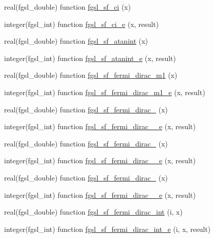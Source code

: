 \begin{DoxyCompactItemize}
\item 
real(fgsl\-\_\-double) function \hyperlink{specfunc_8finc_af37d91f8a5f87d50df39eb28669792a1}{fgsl\-\_\-sf\-\_\-ci} (x)
\item 
integer(fgsl\-\_\-int) function \hyperlink{specfunc_8finc_a60780872ace717f6d08ba8818deafd29}{fgsl\-\_\-sf\-\_\-ci\-\_\-e} (x, result)
\item 
real(fgsl\-\_\-double) function \hyperlink{specfunc_8finc_aea59dd2be70a210689b1d8c72fe0c188}{fgsl\-\_\-sf\-\_\-atanint} (x)
\item 
integer(fgsl\-\_\-int) function \hyperlink{specfunc_8finc_a50b0fa2ad22bafa445a01572532bef66}{fgsl\-\_\-sf\-\_\-atanint\-\_\-e} (x, result)
\item 
real(fgsl\-\_\-double) function \hyperlink{specfunc_8finc_a93a0202e4ca9ec26774efcda9cba3d9e}{fgsl\-\_\-sf\-\_\-fermi\-\_\-dirac\-\_\-m1} (x)
\item 
integer(fgsl\-\_\-int) function \hyperlink{specfunc_8finc_a2634cfd8188ced8da822511514bea417}{fgsl\-\_\-sf\-\_\-fermi\-\_\-dirac\-\_\-m1\-\_\-e} (x, result)
\item 
real(fgsl\-\_\-double) function \hyperlink{specfunc_8finc_a45b38529fa2fd7f50dca41709c8414fc}{fgsl\-\_\-sf\-\_\-fermi\-\_\-dirac\-\_} (x)
\item 
integer(fgsl\-\_\-int) function \hyperlink{specfunc_8finc_a17a9fa088836577a44dd0b3dacbf15d9}{fgsl\-\_\-sf\-\_\-fermi\-\_\-dirac\-\_\-\_\-e} (x, result)
\item 
real(fgsl\-\_\-double) function \hyperlink{specfunc_8finc_a109ba391d8bb217c69c866f3955db733}{fgsl\-\_\-sf\-\_\-fermi\-\_\-dirac\-\_} (x)
\item 
integer(fgsl\-\_\-int) function \hyperlink{specfunc_8finc_adaaba19e458a726cbafc839539cf2045}{fgsl\-\_\-sf\-\_\-fermi\-\_\-dirac\-\_\-\_\-e} (x, result)
\item 
real(fgsl\-\_\-double) function \hyperlink{specfunc_8finc_a80eb8b1b52f1a43af6c7ff6069d6c8e9}{fgsl\-\_\-sf\-\_\-fermi\-\_\-dirac\-\_} (x)
\item 
integer(fgsl\-\_\-int) function \hyperlink{specfunc_8finc_aba4378d6806c9ae250445d8c75df96e7}{fgsl\-\_\-sf\-\_\-fermi\-\_\-dirac\-\_\-\_\-e} (x, result)
\item 
real(fgsl\-\_\-double) function \hyperlink{specfunc_8finc_ad2208724ae514764c396eac76762b470}{fgsl\-\_\-sf\-\_\-fermi\-\_\-dirac\-\_\-int} (i, x)
\item 
integer(fgsl\-\_\-int) function \hyperlink{specfunc_8finc_a31ba435ef71d98ce1d0f9fff5489e146}{fgsl\-\_\-sf\-\_\-fermi\-\_\-dirac\-\_\-int\-\_\-e} (i, x, result)

\end{DoxyCompactItemize}

